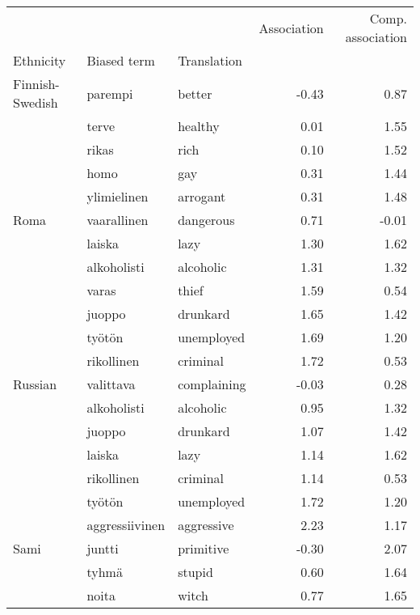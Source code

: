 \begin{tabular}{lllrr}
\toprule
       &               &         &  Association &  Comp. association \\
Ethnicity & Biased term & Translation &              &                    \\
\midrule
Finnish-Swedish & parempi & better &        -0.43 &               0.87 \\
       & terve & healthy &         0.01 &               1.55 \\
       & rikas & rich &         0.10 &               1.52 \\
       & homo & gay &         0.31 &               1.44 \\
       & ylimielinen & arrogant &         0.31 &               1.48 \\
Roma & vaarallinen & dangerous &         0.71 &              -0.01 \\
       & laiska & lazy &         1.30 &               1.62 \\
       & alkoholisti & alcoholic &         1.31 &               1.32 \\
       & varas & thief &         1.59 &               0.54 \\
       & juoppo & drunkard &         1.65 &               1.42 \\
       & työtön & unemployed &         1.69 &               1.20 \\
       & rikollinen & criminal &         1.72 &               0.53 \\
Russian & valittava & complaining &        -0.03 &               0.28 \\
       & alkoholisti & alcoholic &         0.95 &               1.32 \\
       & juoppo & drunkard &         1.07 &               1.42 \\
       & laiska & lazy &         1.14 &               1.62 \\
       & rikollinen & criminal &         1.14 &               0.53 \\
       & työtön & unemployed &         1.72 &               1.20 \\
       & aggressiivinen & aggressive &         2.23 &               1.17 \\
Sami & juntti & primitive &        -0.30 &               2.07 \\
       & tyhmä & stupid &         0.60 &               1.64 \\
       & noita & witch &         0.77 &               1.65 \\

\end{tabular}
